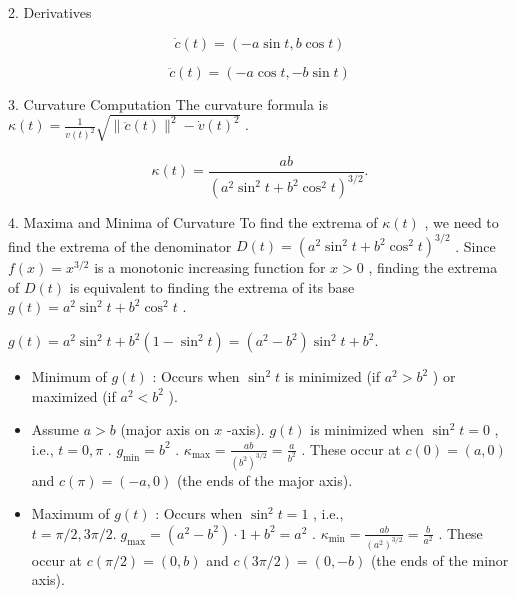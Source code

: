 \documentclass[10pt]{article}
\begin{document}
2. Derivatives

\[
\dot{c}\left( t\right)  = \left( {-a\sin t,b\cos t}\right)
\]

\[
\ddot{c}\left( t\right)  = \left( {-a\cos t, - b\sin t}\right)
\]

3. Curvature Computation The curvature formula is \(\kappa \left( t\right)  = \frac{1}{v{\left( t\right) }^{2}}\sqrt{\parallel \ddot{c}\left( t\right) {\parallel }^{2} - \dot{v}{\left( t\right) }^{2}}\) .

\[
\kappa \left( t\right)  = \frac{ab}{{\left( {a}^{2}{\sin }^{2}t + {b}^{2}{\cos }^{2}t\right) }^{3/2}}.
\]

4. Maxima and Minima of Curvature To find the extrema of \(\kappa \left( t\right)\) , we need to find the extrema of the denominator \(D\left( t\right)  = {\left( {a}^{2}{\sin }^{2}t + {b}^{2}{\cos }^{2}t\right) }^{3/2}\) . Since \(f\left( x\right)  = {x}^{3/2}\) is a monotonic increasing function for \(x > 0\) , finding the extrema of \(D\left( t\right)\) is equivalent to finding the extrema of its base \(g\left( t\right)  = {a}^{2}{\sin }^{2}t + {b}^{2}{\cos }^{2}t\) .

\(g\left( t\right)  = {a}^{2}{\sin }^{2}t + {b}^{2}\left( {1 - {\sin }^{2}t}\right)  = \left( {{a}^{2} - {b}^{2}}\right) {\sin }^{2}t + {b}^{2}.\)

\begin{itemize}\relax
\item\relax Minimum of \(g\left( t\right)\) : Occurs when \({\sin }^{2}t\) is minimized (if \({a}^{2} > {b}^{2}\) ) or maximized (if \({a}^{2} < {b}^{2}\) ).
\end{itemize}

\begin{itemize}\relax
\item\relax Assume \(a > b\) (major axis on \(x\) -axis). \(g\left( t\right)\) is minimized when \({\sin }^{2}t = 0\) , i.e., \(t = 0,\pi\) . \({g}_{\min } = {b}^{2}\) . \({\kappa }_{\max } = \frac{ab}{{\left( {b}^{2}\right) }^{3/2}} = \frac{a}{{b}^{2}}\) . These occur at \(c\left( 0\right)  = \left( {a,0}\right)\) and \(c\left( \pi \right)  = \left( {-a,0}\right)\) (the ends of the major axis).
\end{itemize}

\begin{itemize}\relax
\item\relax Maximum of \(g\left( t\right)\) : Occurs when \({\sin }^{2}t = 1\) , i.e., \(t = \pi /2,{3\pi }/2.\;{g}_{\max } = \left( {{a}^{2} - {b}^{2}}\right)  \cdot  1 + {b}^{2} = {a}^{2}\) . \({\kappa }_{\min } = \frac{ab}{{\left( {a}^{2}\right) }^{3/2}} = \frac{b}{{a}^{2}}\) . These occur at \(c\left( {\pi /2}\right)  = \left( {0,b}\right)\) and \(c\left( {{3\pi }/2}\right)  = \left( {0, - b}\right)\) (the ends of the minor axis).
\end{itemize}
\end{document}
